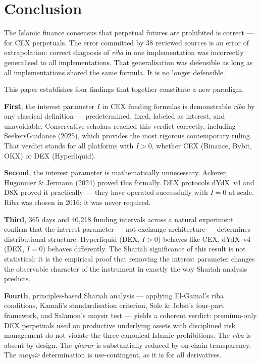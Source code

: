 \documentclass[10pt,twocolumn]{article}
\begin{document}
\section{Conclusion}
\label{sec:conclusion}

The Islamic finance consensus that perpetual futures are prohibited is correct
--- for CEX perpetuals. The error committed by 38 reviewed sources is an error
of extrapolation: correct diagnosis of \textit{riba} in one implementation
was incorrectly generalised to all implementations. That generalisation was
defensible as long as all implementations shared the same formula. It is no
longer defensible.

This paper establishes four findings that together constitute a new paradigm.

\textbf{First}, the interest parameter $I$ in CEX funding formulas is
demonstrable \textit{riba} by any classical definition --- predetermined, fixed,
labeled as interest, and unavoidable. Conservative scholars reached this verdict
correctly, including SeekersGuidance (2025), which provides the most rigorous
contemporary ruling. That verdict stands for all platforms with $I > 0$,
whether CEX (Binance, Bybit, OKX) or DEX (Hyperliquid).

\textbf{Second}, the interest parameter is mathematically unnecessary. Ackerer,
Hugonnier \& Jermann (2024) proved this formally. DEX protocols dYdX~v4 and
D8X proved it practically --- they have operated successfully with $I = 0$ at
scale. Riba was chosen in 2016; it was never required.

\textbf{Third}, 365 days and 40,218 funding intervals across a natural
experiment confirm that the interest parameter --- not exchange architecture ---
determines distributional structure. Hyperliquid (DEX, $I > 0$) behaves like
CEX. dYdX~v4 (DEX, $I = 0$) behaves differently. The Shariah significance of
this result is not statistical: it is the empirical proof that removing the
interest parameter changes the observable character of the instrument in exactly
the way Shariah analysis predicts.

\textbf{Fourth}, principles-based Shariah analysis --- applying El-Gamal's riba
conditions, Kamali's standardisation criterion, Sole \& Jobst's four-part
framework, and Salamon's maysir test --- yields a coherent verdict: premium-only
DEX perpetuals used on productive underlying assets with disciplined risk
management do not violate the three canonical Islamic prohibitions. The
\textit{riba} is absent by design. The \textit{gharar} is substantially reduced
by on-chain transparency. The \textit{maysir} determination is use-contingent,
as it is for all derivatives.
\end{document}
